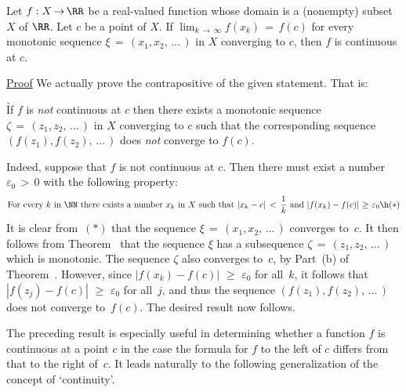 \V

        Let $f:X \,{\rightarrow}\, {\RR}$ be a real-valued function whose domain is a (nonempty) subset $X$ of ${\RR}$.
    Let $c$ be a point of $X$.
    If $\lim_{k \,{\rightarrow}\, {\infty}} f(x_{k}) \,=\, f(c)$ for every monotonic sequence
    ${\xi} \,=\, (x_{1},x_{2},\,{\ldots}\,)$ in $X$ converging to $c$, then $f$ is continuous at $c$.

\V

        \underline{Proof} We actually prove the contrapositive of the given statement. That is:

\VA

        \h If $f$ is {\em not} continuous at $c$ then there exists a monotonic sequence ${{\zeta}} \,=\, (z_{1},z_{2},\,{\ldots}\,)$
    in $X$ converging to $c$ such that the corresponding sequence  $(f(z_{1}),f(z_{2}),\,{\ldots}\,)$ does {\em not} converge to $f(c)$.

\VA

        Indeed, suppose that $f$ is not continuous at $c$. Then there must exist a number ${\varepsilon}_{0}\,>\,0$ with the following property:
        \begin{displaymath}
        \mbox{For every $k$ in ${\NN}$ there exists a number $x_{k}$ in $X$ such that ${\displaystyle |x_{k}-c|\,<\,\frac{1}{k}}$ and $|f(x_{k})-f(c)|\,\,{\geq}\,\,{\varepsilon}_{0}$} \h ({\ast})
        \end{displaymath}
    It is clear from~$({\ast})$ that the sequence ${\xi} \,=\, (x_{1}, x_{2},\,{\ldots}\,)$ converges to~$c$.
    It then follows from Theorem~ that the sequence ${\xi}$ has a subsequence ${\zeta} \,=\, (z_{1}, z_{2},\,{\ldots}\,)$ which is monotonic.
    The sequence ${\zeta}$ also converges to~$c$, by Part~(b) of Theorem~.
    However, since $|f(x_{k}) - f(c)|\,\,{\geq}\,\,{\varepsilon}_{0}$ for all~$k$,
    it follows that $|f(z_{j}) - f(c)|\,\,{\geq}\,\,{\varepsilon}_{0}$ for all~$j$,
    and thus the sequence $(f(z_{1}), f(z_{2}),\,{\ldots}\,)$ does not converge to~$f(c)$. The desired result now follows.

\VV



        The preceding result is especially useful in determining whether a function $f$ is continuous
    at a point $c$ in the case the formula for $f$ to the left of $c$ differs from that to the right of~$c$.
    It leads naturally to the following generalization of the concept of `continuity'.

